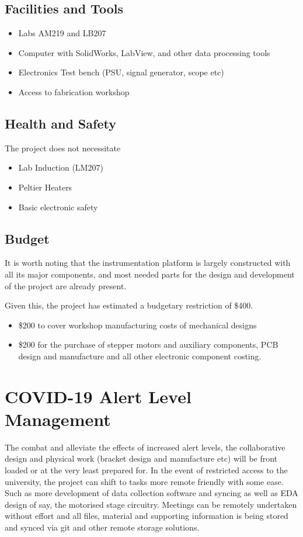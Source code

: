 \documentclass[11pt, a4paper, twoside, openright]{report}
\begin{document}
\subsection{Facilities and Tools}
\begin{itemize}
  \item Labs AM219 and LB207
  \item Computer with SolidWorks, LabView, and other data processing tools
  \item Electronics Test bench (PSU, signal generator, scope etc)
  \item Access to fabrication workshop
\end{itemize}

\subsection{Health and Safety}
The project does not necessitate
\begin{itemize}
  \item Lab Induction (LM207)
  \item Peltier Heaters
  \item Basic electronic safety
\end{itemize}


\subsection{Budget}
It is worth noting that the instrumentation platform is largely constructed with all its major components, and most needed parts for the design and development of the project are already present.

Given this, the project has estimated a budgetary restriction of \$400.
\begin{itemize}
  \item \$200 to cover workshop manufacturing costs of mechanical designs
  \item \$200 for the purchase of stepper motors and auxiliary components, PCB design and manufacture and all other electronic component costing.
\end{itemize}

\section{COVID-19 Alert Level Management}
The combat and alleviate the effects of increased alert levels, the collaborative design and physical work (bracket design and manufacture etc) will be front loaded or at the very least prepared for. In the event of restricted access to the university, the project can shift to tasks more remote friendly with some ease. Such as more development of data collection software and syncing as well as EDA design of say, the motorised stage circuitry. Meetings can be remotely undertaken without effort and all files, material and supporting information is being stored and synced via git and other remote storage solutions.
\end{document}
